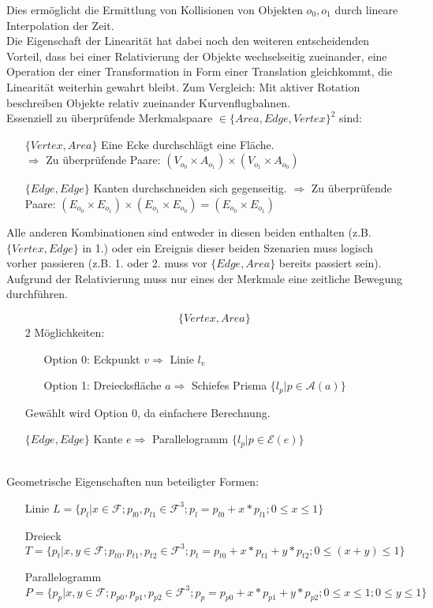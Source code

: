Dies ermöglicht die Ermittlung von Kollisionen von Objekten $o_0, o_1$ durch lineare Interpolation der Zeit.\\
Die Eigenschaft der Linearität hat dabei noch den weiteren entscheidenden Vorteil, dass bei einer Relativierung der Objekte wechselseitig zueinander, eine Operation der einer Transformation in Form einer Translation gleichkommt, die Linearität weiterhin gewahrt bleibt. Zum Vergleich: Mit aktiver Rotation beschreiben Objekte relativ zueinander Kurvenflugbahnen.\\
Essenziell zu überprüfende Merkmalspaare $\in \{Area, Edge, Vertex\}^2$ sind:
		\begin{itemize}
			\item [$\{Vertex, Area\}$] Eine Ecke durchschlägt eine Fläche.\\
				$\Rightarrow$ Zu überprüfende Paare: $(V_{o_0}\times A_{o_1})\times (V_{o_1}\times A_{o_0})$
			\item [$\{Edge, Edge\}$] Kanten durchschneiden sich gegenseitig.
				$\Rightarrow$ Zu überprüfende Paare: $(E_{o_0}\times E_{o_1})\times (E_{o_1}\times E_{o_0}) = (E_{o_0}\times E_{o_1})$
		\end{itemize}
		Alle anderen Kombinationen sind entweder in diesen beiden enthalten (z.B. $\{Vertex, Edge\}$ in 1.) oder ein Ereignis dieser beiden Szenarien muss logisch vorher passieren (z.B. 1. oder 2. muss vor $\{Edge, Area\}$ bereits passiert sein).
\ \\
		Aufgrund der Relativierung muss nur eines der Merkmale eine zeitliche Bewegung durchführen.
		\begin{itemize}
			\item [$$\{Vertex, Area\}$$] 2 Möglichkeiten:
				\begin{itemize}
					\item[Option 0:] Eckpunkt $v \Rightarrow$ Linie $l_v$
					\item[Option 1:] Dreiecksfläche $a \Rightarrow$ Schiefes Prisma $ \{l_p | p \in \mathcal{A}(a)\}$
				\end{itemize}
				Gewählt wird Option 0, da einfachere Berechnung.
			\item [$\{Edge, Edge\}$] Kante $e \Rightarrow$ Parallelogramm $\{l_p | p \in \mathcal{E}(e)\}$
		\end{itemize}
\ \\
		Geometrische Eigenschaften nun beteiligter Formen:
		\begin{itemize}
			\item [Linie] $L = \{p_l | x\in\mathcal{F} ; p_{l0}, p_{l1} \in \mathcal{F}^3 ; p_l = p_{l0} + x * p_{l1}; 0\le x\le 1 \}$
		\item [Dreieck] $T = \{p_t | x,y \in\mathcal{F};  p_{t0},  p_{t1},  p_{t2} \in \mathcal{F}^3; p_t = p_{t0} + x*p_{t1} + y*p_{t2}; 0\le (x+y) \le 1\}$
			\item [Parallelogramm] $P = \{p_p | x,y \in\mathcal{F}; p_{p0}, p_{p1}, p_{p2} \in \mathcal{F}^3; p_p = p_{p0} + x*p_{p1} + y*p_{p2}; 0\le x\le 1; 0\le y\le 1\}$
		\end{itemize}
